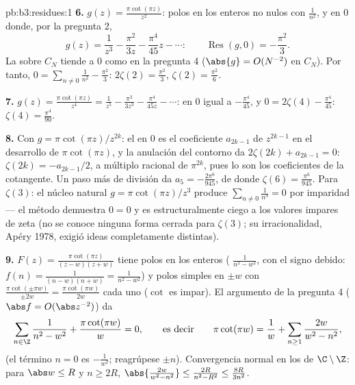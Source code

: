 \begin{solution}{pb:b3:residues:1}
\textbf{6.} $g(z) = \frac{\pi\cot(\pi z)}{z^2}$: polos en los enteros no
nulos con 
$\frac1{n^2}$, y en $0$ donde, por la pregunta 2,
\[
g(z) = \frac1{z^3} - \frac{\pi^2}{3z} - \frac{\pi^4}{45}z -
\cdots :
\qquad \operatorname{Res}(g, 0) = -\frac{\pi^2}3 .
\]
La  sobre $C_N$
tiende a $0$ como en la pregunta 4 ($\abs{g} = O(N^{-2})$ en $C_N$). Por
tanto, $0 =
\sum_{n\neq0}\frac1{n^2} - \frac{\pi^2}3$: $2\zeta(2) =
\frac{\pi^2}3$, $\zeta(2) = \frac{\pi^2}6$.

\textbf{7.} $g(z) = \frac{\pi\cot(\pi z)}{z^4} = \frac1{z^5}
- \frac{\pi^2}{3z^3} - \frac{\pi^4}{45z} - \cdots$:
 en $0$ igual a
$-\frac{\pi^4}{45}$, y $0 =
2\zeta(4) - \frac{\pi^4}{45}$: $\zeta(4) =
\frac{\pi^4}{90}$.

\textbf{8.} Con $g = \pi\cot(\pi z)/z^{2k}$: el
 en $0$ es el coeficiente
$a_{2k-1}$ de $z^{2k-1}$ en el desarrollo de $\pi\cot(\pi z)$, y la
anulación del contorno da
$2\zeta(2k) + a_{2k-1} = 0$: $\zeta(2k) = -a_{2k-1}/2$, a
múltiplo racional de $\pi^{2k}$, pues lo son los coeficientes de la
cotangente. Un paso más de división da $a_5 =
-\frac{2\pi^6}{945}$, de donde $\zeta(6) = \frac{\pi^6}{945}$. Para
$\zeta(3)$: el núcleo natural $g = \pi\cot(\pi z)/z^3$ produce
$\sum_{n\neq0}\frac1{n^3} = 0$ por imparidad --- el método demuestra
$0 = 0$ y es estructuralmente ciego a los valores impares de zeta (no se
conoce ninguna forma cerrada para $\zeta(3)$; su irracionalidad, Apéry
1978, exigió ideas completamente distintas).

\textbf{9.} $F(z) = \frac{\pi\cot(\pi z)}{(z - w)(z + w)}$
tiene polos en los enteros
( $\frac1{n^2 - w^2}$,
con el signo debido: $f(n) = \frac1{(n-w)(n+w)} = \frac1{n^2 -
w^2}$) y polos simples en $\pm w$ con
$\frac{\pi\cot(\pm\pi w)}{\pm2w} = \frac{\pi\cot(\pi
w)}{2w}$ cada uno ($\cot$ es impar). El argumento de la pregunta 4
($\abs f = O(\abs z^{-2})$) da
\[
\sum_{n\in\Z}\frac1{n^2 - w^2} + \frac{\pi\cot(\pi w)}{w} =
0,
\qquad\text{es decir}\qquad
\pi\cot(\pi w) = \frac1w + \sum_{n\geq1}\frac{2w}{w^2 -
n^2},
\]
(el término $n = 0$ es $-\frac1{w^2}$; reagrúpese $\pm n$). Convergencia
normal en los  de
$\C\setminus\Z$: para $\abs w \leq
R$ y $n \geq 2R$, $\abs{\frac{2w}{w^2 - n^2}} \leq
\frac{2R}{n^2 - R^2} \leq \frac{8R}{3n^2}$.


\end{solution}
